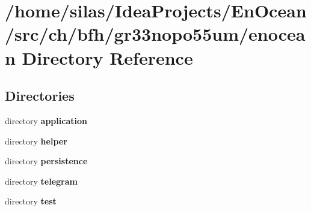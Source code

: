 \section{/home/silas/\+Idea\+Projects/\+En\+Ocean/src/ch/bfh/gr33nopo55um/enocean Directory Reference}
\label{dir_6ab6ac135f51c4f4b0fc144eb35a5121}
\subsection*{Directories}
\begin{DoxyCompactItemize}
\item 
directory {\bf application}
\item 
directory {\bf helper}
\item 
directory {\bf persistence}
\item 
directory {\bf telegram}
\item 
directory {\bf test}
\end{DoxyCompactItemize}

